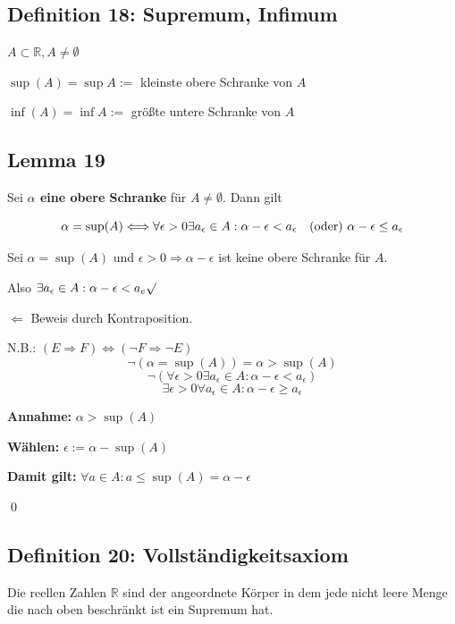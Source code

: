 \documentclass[fleqn]{scrbook}
\newcommand{\qq}[1]{\glqq #1\grqq}
\newcommand{\R}{\mathbb{R}}
\renewenvironment{proof}{{\bfseries Beweis }}{\qed}
\begin{document}
\subsection{Definition 18: Supremum, Infimum}

$A \subset \R, A \neq \emptyset$

$\sup(A)=\sup A := $ kleinste obere Schranke von $A$

$\inf(A)=\inf A := $ größte untere Schranke von $A$

\subsection{Lemma 19}

Sei \textbf{$\alpha$ eine obere Schranke} für $A \neq \emptyset$. Dann gilt

\[\alpha = \sup(A) \Longleftrightarrow \forall \epsilon > 0 \exists a_{\epsilon} \in A : \alpha - \epsilon < a_{\epsilon} \text{\quad(oder) } \alpha - \epsilon \leq a_{\epsilon}\]

\begin{proof}

Sei $\alpha = \sup(A)$ und $\epsilon > 0 \Longrightarrow \alpha - \epsilon$ ist keine obere Schranke für $A$.

Also $\exists a_{\epsilon} \in A: \alpha -\epsilon < a_e\surd$

\qq{$\Longleftarrow$} Beweis durch Kontraposition.

N.B.: $(E \Longrightarrow F) \Longleftrightarrow (\lnot F \Longrightarrow \lnot E)$
\[\lnot (\alpha = \sup(A))= \alpha > \sup(A) \]
\[\lnot (\forall \epsilon > 0 \exists a_{\epsilon} \in A:\alpha -\epsilon < a_{\epsilon}) \]
\[\exists \epsilon > 0 \boxed{\forall a_{\epsilon} \in A:\alpha -\epsilon \geq a_{\epsilon}}\]

\textbf{Annahme:} $\alpha > \sup(A)$

\textbf{Wählen:} $\epsilon:=\alpha-\sup(A)$

\textbf{Damit gilt:} $\forall a \in A : a \leq \sup(A) = \alpha - \epsilon$  

\end{proof}

\subsection{Definition 20: Vollständigkeitsaxiom}

Die reellen Zahlen $\R$ sind der angeordnete Körper in dem jede nicht leere Menge die nach oben beschränkt ist ein Supremum hat.
\end{document}
